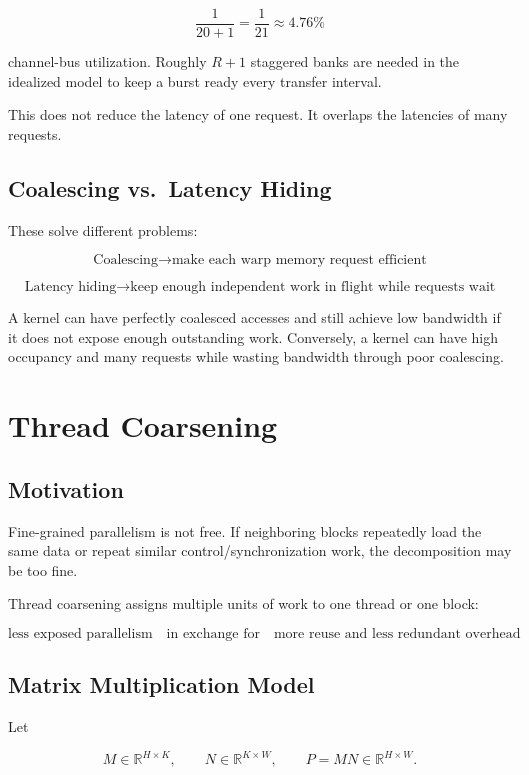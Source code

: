 \documentclass[11pt]{article}
\begin{document}
\[
\frac{1}{20+1}
=
\frac{1}{21}
\approx 4.76\%
\]

channel-bus utilization. Roughly \(R+1\) staggered banks are needed in the idealized model to keep a burst ready every transfer interval.

This does not reduce the latency of one request. It overlaps the latencies of many requests.

\subsection{Coalescing vs.\ Latency Hiding}

These solve different problems:

\[
\boxed{
\text{Coalescing}
\rightarrow
\text{make each warp memory request efficient}
}
\]

\[
\boxed{
\text{Latency hiding}
\rightarrow
\text{keep enough independent work in flight while requests wait}
}
\]

A kernel can have perfectly coalesced accesses and still achieve low bandwidth if it does not expose enough outstanding work. Conversely, a kernel can have high occupancy and many requests while wasting bandwidth through poor coalescing.

\section{Thread Coarsening}

\subsection{Motivation}

Fine-grained parallelism is not free. If neighboring blocks repeatedly load the same data or repeat similar control/synchronization work, the decomposition may be too fine.

Thread coarsening assigns multiple units of work to one thread or one block:

\[
\boxed{
\text{less exposed parallelism}
\quad\text{in exchange for}\quad
\text{more reuse and less redundant overhead}
}
\]

\subsection{Matrix Multiplication Model}

Let

\[
M\in\mathbb{R}^{H\times K},
\qquad
N\in\mathbb{R}^{K\times W},
\qquad
P=MN\in\mathbb{R}^{H\times W}.
\]
\end{document}
